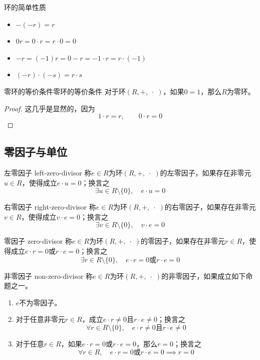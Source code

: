 \begin{proposition}{环的简单性质}
	\begin{itemize}
		\item $-(-r)=r$
		\item $0r=0\cdot r=r\cdot 0=0$
		\item $-r=(-1)r=0-r=-1\cdot r=r\cdot(-1)$
		\item $(-r)\cdot(-s)=r\cdot s$
	\end{itemize}
\end{proposition}

\begin{proposition}{零环的等价条件}{零环的等价条件}
	对于环$(R,+,\;\cdot\;)$，如果$0=1$，那么$R$为零环。
\end{proposition}

\begin{proof}
	这几乎是显然的，因为
	$$
	1\cdot r=r,\qquad 0\cdot r=0
	$$
\end{proof}

\subsection{零因子与单位}

\begin{definition}{左零因子 left-zero-divisor}
	称$e\in R$为环$(R,+,\;\cdot\;)$的左零因子，如果存在非零元$u\in R$，使得成立$e\cdot u=0$；换言之
	$$
	\exists u\in R\setminus\{0\},\quad e\cdot u=0
	$$
\end{definition}

\begin{definition}{右零因子 right-zero-divisor}
	称$e\in R$为环$(R,+,\;\cdot\;)$的右零因子，如果存在非零元$v\in R$，使得成立$v\cdot e=0$；换言之
	$$
	\exists v\in R\setminus\{0\},\quad v\cdot e=0
	$$
\end{definition}

\begin{definition}{零因子 zero-divisor}
	称$e\in R$为环$(R,+,\;\cdot\;)$的零因子，如果存在非零元$r\in R$，使得成立$e\cdot r=0$或$r\cdot e=0$；换言之
	$$
	\exists r\in R\setminus\{0\},\quad e\cdot r=0\text{或}r\cdot e=0
	$$
\end{definition}

\begin{definition}{非零因子 non-zero-divisor}
	称$e\in R$为环$(R,+,\;\cdot\;)$的非零因子，如果成立如下命题之一。
	\begin{enumerate}
		\item $e$不为零因子。
		\item 对于任意非零元$r\in R$，成立$e\cdot r\ne0$且$r\cdot e\ne0$；换言之
		$$
		\forall r\in R\setminus\{0\},\quad e\cdot r\ne0\text{且}r\cdot e\ne0
		$$
		\item 对于任意$r\in R$，如果$e\cdot r=0$或$r\cdot e=0$，那么$r=0$；换言之
		$$
		\forall r\in R,\quad e\cdot r=0\text{或}r\cdot e=0\implies r=0
		$$
	\end{enumerate}
\end{definition}


